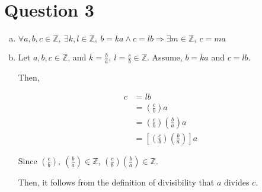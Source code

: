 \documentclass[12pt]{article}
\begin{document}
\section*{Question 3}
\begin{enumerate}[a.]
    \item

    $\forall a,b,c \in \mathbb{Z},\:\exists k,l \in \mathbb{Z},\:b = ka \land c = lb
    \Rightarrow \exists m \in \mathbb{Z},\:c = ma$

    \item

    Let $a,b,c \in \mathbb{Z}$, and $k = \frac{b}{a},\:l = \frac{c}{b} \in \mathbb{Z}$.
    Assume, $b = ka$ and $c = lb$.

    \bigskip

    Then,

    \begin{align}
        c &= lb\\
        &= \left( \frac{c}{b} \right) a\\
        &= \left( \frac{c}{b} \right) \left( \frac{b}{a} \right) a\\
        &= \left[ \left( \frac{c}{b} \right) \left( \frac{b}{a} \right) \right] a
    \end{align}

    \bigskip

    Since $\left( \frac{c}{b} \right),\:\left( \frac{b}{a} \right) \in \mathbb{Z}$,
    $\left( \frac{c}{b} \right) \left( \frac{b}{a} \right) \in \mathbb{Z}$.

    \bigskip

    Then, it follows from the definition of divisibility that $a$ divides $c$.

\end{enumerate}
\end{document}
